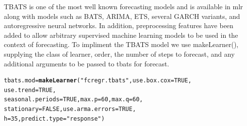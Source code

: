 \documentclass{article}\usepackage[]{graphicx}\usepackage[]{color}
\makeatletter
\newcommand{\hlnum}[1]{\textcolor[rgb]{0.686,0.059,0.569}{#1}}%
\newcommand{\hlstr}[1]{\textcolor[rgb]{0.192,0.494,0.8}{#1}}%
\newcommand{\hlstd}[1]{\textcolor[rgb]{0.345,0.345,0.345}{#1}}%
\newcommand{\hlkwb}[1]{\textcolor[rgb]{0.69,0.353,0.396}{#1}}%
\newcommand{\hlkwc}[1]{\textcolor[rgb]{0.333,0.667,0.333}{#1}}%
\newcommand{\hlkwd}[1]{\textcolor[rgb]{0.737,0.353,0.396}{\textbf{#1}}}%
\newenvironment{kframe}{%
 \def\at@end@of@kframe{}%
 \ifinner\ifhmode%
  \def\at@end@of@kframe{\end{minipage}}%
  \begin{minipage}{\columnwidth}%
 \fi\fi%
 \def\FrameCommand##1{\hskip\@totalleftmargin \hskip-\fboxsep
 \colorbox{shadecolor}{##1}\hskip-\fboxsep
     \hskip-\linewidth \hskip-\@totalleftmargin \hskip\columnwidth}%
 \MakeFramed {\advance\hsize-\width
   \@totalleftmargin\z@ \linewidth\hsize
   \@setminipage}}%
 {\par\unskip\endMakeFramed%
 \at@end@of@kframe}
\newenvironment{knitrout}{}{} %
\theoremstyle{definition}
\newcommand\code{\@codex}
\def\@codex#1{{\normalfont\ttfamily\hyphenchar\font=-1 #1}}
\newcommand{\pkg}[1]{{\fontseries{b}\selectfont #1}}
\makeatother
\begin{document}

TBATS is one of the most well known forecasting models and is available in mlr along with models such as BATS, ARIMA, ETS, several GARCH variants, and autoregressive neural networks. In addition, preprocessing features have been added to allow arbitrary supervised machine learning models to be used in the context of forecasting. To impliment the TBATS model we use  \code{makeLearner()}, supplying the class of learner, order, the number of steps to forecast, and any additional arguments to be passed to \code{tbats} for \pkg{forecast}. 

\begin{knitrout}
\color{fgcolor}\begin{kframe}
\begin{alltt}
\hlstd{tbats.mod} \hlkwb{=}\hlkwd{makeLearner}\hlstd{(}\hlstr{"fcregr.tbats"}\hlstd{,} \hlkwc{use.box.cox} \hlstd{=} \hlnum{TRUE}\hlstd{,}
                      \hlkwc{use.trend} \hlstd{=} \hlnum{TRUE}\hlstd{,}
                      \hlkwc{seasonal.periods} \hlstd{=} \hlnum{TRUE}\hlstd{,} \hlkwc{max.p} \hlstd{=} \hlnum{60}\hlstd{,} \hlkwc{max.q} \hlstd{=} \hlnum{60}\hlstd{,}
                      \hlkwc{stationary} \hlstd{=} \hlnum{FALSE}\hlstd{,} \hlkwc{use.arma.errors} \hlstd{=} \hlnum{TRUE}\hlstd{,}
                      \hlkwc{h} \hlstd{=} \hlnum{35}\hlstd{,} \hlkwc{predict.type} \hlstd{=} \hlstr{"response"}\hlstd{)}
\end{alltt}
\end{kframe}
\end{knitrout}
\end{document}
